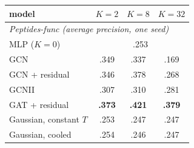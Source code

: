 \begin{tabular}{lccc}
\toprule
model & $K=2$ & $K=8$ & $K=32$\\
\midrule
\multicolumn{4}{l}{\emph{Peptides-func (average precision, one seed)}}\\
MLP ($K=0$) & \multicolumn{3}{c}{.253}\\
GCN & .349 & .337 & .169\\
GCN + residual & .346 & .378 & .268\\
GCNII & .307 & .310 & .281\\
GAT + residual & \textbf{.373} & \textbf{.421} & \textbf{.379}\\
Gaussian, constant $T$ & .253 & .247 & .247\\
Gaussian, cooled & .254 & .246 & .247\\
\bottomrule
\end{tabular}

